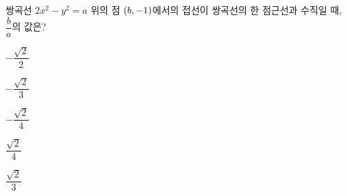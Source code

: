쌍곡선 $2x^2-y^2=a$ 위의 점 $(b{,}\mkern3mu\mathopen{}-1)$에서의 접선이 쌍곡선의 한 점근선과 수직일 때, $\dfrac{b}{a}$의 값은? 
\begin{choices32}{\rule[-3ex]{0pt}{8ex}$-\dfrac{\sqrt{2}}{2}$}{\rule[-3ex]{0pt}{8ex}$-\dfrac{\sqrt{2}}{3}$}{\rule[-3ex]{0pt}{8ex}$-\dfrac{\sqrt{2}}{4}$}{\rule[-3ex]{0pt}{8ex}$\dfrac{\sqrt{2}}{4}$}{\rule[-3ex]{0pt}{8ex}$\dfrac{\sqrt{2}}{3}$}\end{choices32}
